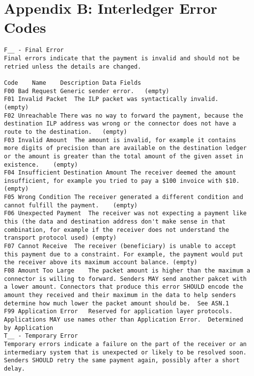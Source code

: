 \documentclass[11pt,twoside,a4paper]{article}
\begin{document}
\section{Appendix B: Interledger Error Codes}
\begin{verbatim}
F__ - Final Error
Final errors indicate that the payment is invalid and should not be retried unless the details are changed.

Code	Name	Description	Data Fields
F00	Bad Request	Generic sender error.	(empty)
F01	Invalid Packet	The ILP packet was syntactically invalid.	(empty)
F02	Unreachable	There was no way to forward the payment, because the destination ILP address was wrong or the connector does not have a route to the destination.	(empty)
F03	Invalid Amount	The amount is invalid, for example it contains more digits of precision than are available on the destination ledger or the amount is greater than the total amount of the given asset in existence.	(empty)
F04	Insufficient Destination Amount	The receiver deemed the amount insufficient, for example you tried to pay a $100 invoice with $10.	(empty)
F05	Wrong Condition	The receiver generated a different condition and cannot fulfill the payment.	(empty)
F06	Unexpected Payment	The receiver was not expecting a payment like this (the data and destination address don't make sense in that combination, for example if the receiver does not understand the transport protocol used)	(empty)
F07	Cannot Receive	The receiver (beneficiary) is unable to accept this payment due to a constraint. For example, the payment would put the receiver above its maximum account balance.	(empty)
F08	Amount Too Large	The packet amount is higher than the maximum a connector is willing to forward. Senders MAY send another pakcet with a lower amount. Connectors that produce this error SHOULD encode the amount they received and their maximum in the data to help senders determine how much lower the packet amount should be.	See ASN.1
F99	Application Error	Reserved for application layer protocols. Applications MAY use names other than Application Error.	Determined by Application
T__ - Temporary Error
Temporary errors indicate a failure on the part of the receiver or an intermediary system that is unexpected or likely to be resolved soon. Senders SHOULD retry the same payment again, possibly after a short delay.


\end{verbatim}
\end{document}
